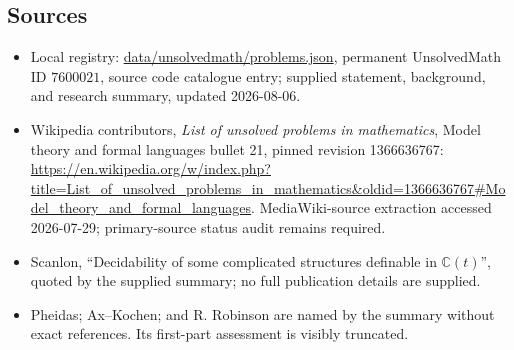 \documentclass[11pt]{article}
\begin{document}
\subsection{Sources}
\begin{itemize}
\item Local registry: \url{data/unsolvedmath/problems.json}, permanent UnsolvedMath ID \(7600021\), source code catalogue entry; supplied statement, background, and research summary, updated 2026-08-06.
\item Wikipedia contributors, \emph{List of unsolved problems in mathematics}, Model theory and formal languages bullet 21, pinned revision 1366636767: \url{https://en.wikipedia.org/w/index.php?title=List_of_unsolved_problems_in_mathematics&oldid=1366636767#Model_theory_and_formal_languages}. MediaWiki-source extraction accessed 2026-07-29; primary-source status audit remains required.
\item Scanlon, ``Decidability of some complicated structures definable in \(\mathbb C(t)\)'', quoted by the supplied summary; no full publication details are supplied.
\item Pheidas; Ax--Kochen; and R. Robinson are named by the summary without exact references. Its first-part assessment is visibly truncated.
\end{itemize}
\end{document}
